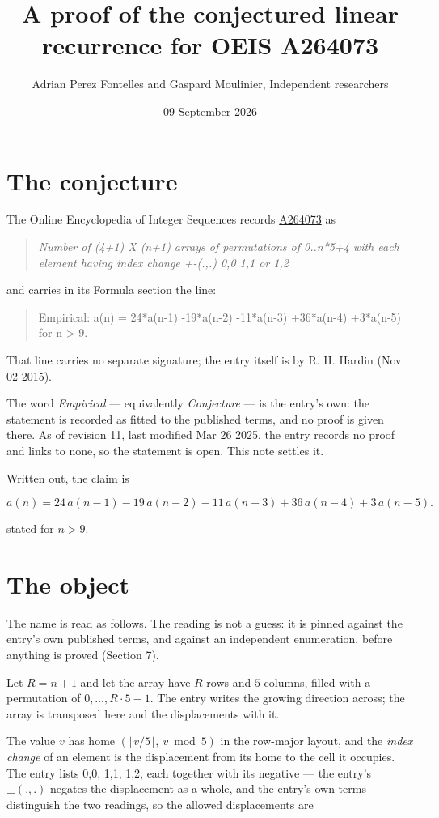 \documentclass[11pt]{article}
\title{A proof of the conjectured linear recurrence for OEIS A264073}
\author{Adrian Perez Fontelles and Gaspard Moulinier, Independent researchers}
\date{09 September 2026}
\theoremstyle{definition}
\begin{document}
\maketitle
\section{The conjecture}

The Online Encyclopedia of Integer Sequences records \href{https://oeis.org/A264073}{A264073} as

\begin{quote}\itshape Number of (4+1) X (n+1) arrays of permutations of 0..n*5+4 with each element having index change +-(.,.) 0,0 1,1 or 1,2\end{quote}

and carries in its Formula section the line:

\begin{quote}\ttfamily Empirical: a(n) = 24*a(n-1) -19*a(n-2) -11*a(n-3) +36*a(n-4) +3*a(n-5) for n > 9.\end{quote}

That line carries no separate signature; the entry itself is by R. H. Hardin (Nov 02 2015).

The word {\itshape Empirical} --- equivalently {\itshape Conjecture} --- is the entry's own: the statement is recorded as fitted to the published terms, and no proof is given there. As of revision 11, last modified Mar 26 2025, the entry records no proof and links to none, so the statement is open. This note settles it.

Written out, the claim is

\[a(n) = 24\,a(n-1) - 19\,a(n-2) - 11\,a(n-3) + 36\,a(n-4) + 3\,a(n-5).\]

stated for $n > 9$.

\section{The object}

The name is read as follows. The reading is not a guess: it is pinned against the entry's own published terms, and against an independent enumeration, before anything is proved (Section 7).

Let $R = n + 1$ and let the array have $R$ rows and $5$ columns, filled with a permutation of $0,\dots,R\cdot5-1$. The entry writes the growing direction across; the array is transposed here and the displacements with it.

The value $v$ has home $(\lfloor v/5\rfloor,\ v \bmod 5)$ in the row-major layout, and the {\itshape index change} of an element is the displacement from its home to the cell it occupies. The entry lists 0,0, 1,1, 1,2, each together with its negative --- the entry's $\pm(.,.)$ negates the displacement as a whole, and the entry's own terms distinguish the two readings, so the allowed displacements are
\end{document}
